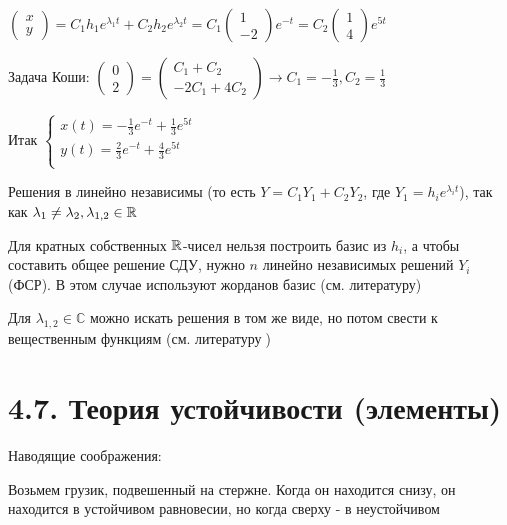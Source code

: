\documentclass[12pt]{article}
\begin{document}
    $\begin{pmatrix}x \\ y\end{pmatrix} = C_1 h_1 e^{\lambda_1 t} + C_2 h_2 e^{\lambda_2 t} =
    C_1 \begin{pmatrix}1 \\ -2\end{pmatrix} e^{-t} = C_2 \begin{pmatrix}1 \\ 4\end{pmatrix} e^{5t}$

    Задача Коши: $\begin{pmatrix}0 \\ 2\end{pmatrix} = \begin{pmatrix}
                                                           C_1 + C_2 \\ -2C_1 + 4C_2
    \end{pmatrix} \to C_1 = -\frac{1}{3}, C_2 = \frac{1}{3}$

    Итак $\begin{cases}
              x(t) = -\frac{1}{3} e^{-t} + \frac{1}{3} e^{5t} \\
              y(t) = \frac{2}{3} e^{-t} + \frac{4}{3} e^{5t} \\
    \end{cases}$

    Решения в \Exs линейно независимы (то есть $Y = C_1 Y_1 + C_2 Y_2$, где $Y_1 = h_i e^{\lambda_i t}$), так как $\lambda_1 \neq \lambda_2, \lambda_{1,2} \in \mathbb{R}$

    Для кратных собственных $\mathbb{R}$-чисел нельзя построить базис из $h_i$, а чтобы составить общее решение СДУ,
    нужно $n$ линейно независимых решений $Y_i$ (ФСР). В этом случае используют жорданов базис (см. литературу)

    Для $\lambda_{1,2} \in \mathbb{C}$ можно искать решения в том же виде, но потом свести к вещественным функциям (см. литературу{\huge 🧐})

    \section{4.7. Теория устойчивости (элементы)}

    Наводящие соображения:

    Возьмем грузик, подвешенный на стержне. Когда он находится снизу, он находится в устойчивом равновесии, но когда сверху - в неустойчивом
\end{document}
